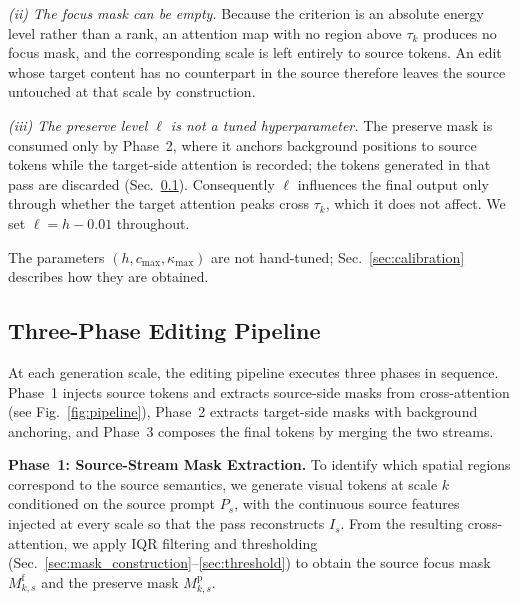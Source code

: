 \textit{(ii) The focus mask can be empty.} Because the criterion is an absolute energy level rather than a rank, an attention map with no region above $\tau_k$ produces no focus mask, and the corresponding scale is left entirely to source tokens. An edit whose target content has no counterpart in the source therefore leaves the source untouched at that scale by construction.

\textit{(iii) The preserve level $\ell$ is not a tuned hyperparameter.} The preserve mask is consumed only by Phase~2, where it anchors background positions to source tokens while the target-side attention is recorded; the tokens generated in that pass are discarded (Sec.~\ref{sec:pipeline}). Consequently $\ell$ influences the final output only through whether the target attention peaks cross $\tau_k$, which it does not affect. We set $\ell = h - 0.01$ throughout.

The parameters $(h, c_{\max}, \kappa_{\max})$ are not hand-tuned; Sec.~\ref{sec:calibration} describes how they are obtained.

\subsection{Three-Phase Editing Pipeline}
\label{sec:pipeline}

At each generation scale, the editing pipeline executes three phases in sequence. Phase~1 injects source tokens and extracts source-side masks from cross-attention (see Fig.~\ref{fig:pipeline}), Phase~2 extracts target-side masks with background anchoring, and Phase~3 composes the final tokens by merging the two streams.

\noindent\textbf{Phase~1: Source-Stream Mask Extraction.}
To identify which spatial regions correspond to the source semantics, we generate visual tokens at scale $k$ conditioned on the source prompt $P_s$, with the continuous source features injected at every scale so that the pass reconstructs $I_s$. From the resulting cross-attention, we apply IQR filtering and thresholding (Sec.~\ref{sec:mask_construction}--\ref{sec:threshold}) to obtain the source focus mask $M_{k,s}^{\mathrm{f}}$ and the preserve mask $M_{k,s}^{\mathrm{p}}$.

